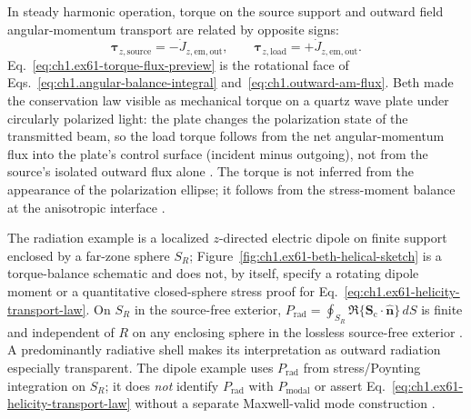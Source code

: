 \FloatBarrier
In steady harmonic operation, torque on the source support and outward field angular-momentum transport are related by opposite signs:
\begin{equation}
\label{eq:ch1.ex61-torque-flux-preview}
\boldsymbol{\tau}_{z,\mathrm{source}}=-\dot J_{z,\mathrm{em,out}},
\qquad
\boldsymbol{\tau}_{z,\mathrm{load}}=+\dot J_{z,\mathrm{em,out}}.
\end{equation}
Eq.~\eqref{eq:ch1.ex61-torque-flux-preview} is the rotational face of Eqs.~\eqref{eq:ch1.angular-balance-integral} and~\eqref{eq:ch1.outward-am-flux}. Beth \cite{beth1936} made the conservation law visible as mechanical torque on a quartz wave plate under circularly polarized light: the plate changes the polarization state of the transmitted beam, so the load torque follows from the net angular-momentum flux into the plate's control surface (incident minus outgoing), not from the source's isolated outward flux alone \cite{beth1936,stratton1941}. The torque is not inferred from the appearance of the polarization ellipse; it follows from the stress-moment balance at the anisotropic interface \cite{beth1936,stratton1941}.

The radiation example is a localized $z$-directed electric dipole on finite support
enclosed by a far-zone sphere $S_R$; Figure~\ref{fig:ch1.ex61-beth-helical-sketch} is a torque-balance schematic and does not, by itself, specify a rotating dipole moment or a quantitative closed-sphere stress proof for Eq.~\eqref{eq:ch1.ex61-helicity-transport-law}. On $S_R$ in the source-free exterior,
$P_{\mathrm{rad}}=\oint_{S_R}\Re\{\mathbf{S}_\mathrm{c}\cdot\hat{\mathbf{n}}\}\,dS$ is
finite and independent of $R$ on any enclosing sphere in the lossless source-free exterior
\cite{stratton1941,beth1936}. A predominantly radiative shell makes its interpretation as outward radiation especially transparent. The dipole example uses $P_{\mathrm{rad}}$ from stress/Poynting integration on $S_R$; it does \emph{not} identify $P_{\mathrm{rad}}$ with $P_{\mathrm{modal}}$ or assert Eq.~\eqref{eq:ch1.ex61-helicity-transport-law} without a separate Maxwell-valid mode construction \cite{stratton1941}.

